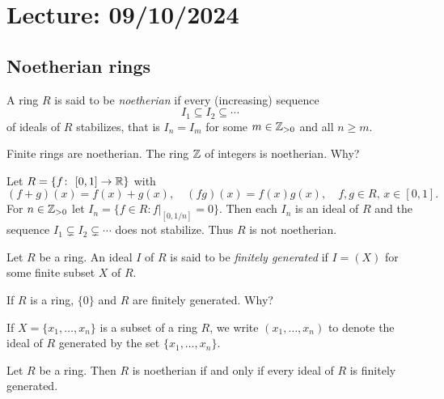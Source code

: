 \section{Lecture: 09/10/2024}

\subsection{Noetherian rings}

\begin{definition}
	A ring $R$ is said to be \emph{noetherian} if every (increasing)
	sequence \[
 I_1\subseteq I_2\subseteq\cdots
 \]
 of ideals of $R$
	stabilizes, that is $I_n=I_m$ for some $m\in\mathbb{Z}_{>0}$ and all $n\geq m$. 
\end{definition}

Finite rings
are noetherian. The ring $\mathbb{Z}$ of integers is noetherian. Why?

\begin{exercise}
Let $R=\{f\colon [0,1]\to\R\}$ with 
\[
(f+g)(x)=f(x)+g(x),
\quad
(fg)(x)=f(x)g(x),
\quad
f,g\in R,\,x\in [0,1].
\]
For $n\in\mathbb{Z}_{>0}$ let
$I_n=\{f\in R:f|_{[0,1/n]}=0\}$. Then each $I_n$ is an ideal of $R$ and 
the sequence 
$I_1\subsetneq I_2\subsetneq\cdots$ 
does not stabilize. Thus $R$ is not noetherian. 
\end{exercise}

\begin{definition}
	Let $R$ be a ring. An ideal $I$ of $R$ 
	is said to be \emph{finitely generated} if $I=(X)$ for some
	finite subset $X$ of $R$. 
\end{definition}

If $R$ is a ring, $\{0\}$ and $R$ are finitely generated. Why?

If $X=\{x_1,\dots,x_n\}$ is a subset of a ring $R$, 
we write $(x_1,\dots,x_n)$ to denote 
the ideal of $R$ generated by the set $\{x_1,\dots,x_n\}$. 

\begin{proposition}
Let $R$ be a ring. Then $R$ is noetherian if and only 
if every ideal of $R$ is finitely generated. 	
\end{proposition}

